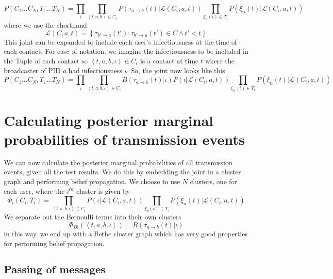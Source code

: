\documentclass{article}
\begin{document}
\begin{equation}
P(C_1...C_N, T_1...T_N) =
\prod_{i} \prod_{\left< t,a,b \right> \in C_i}
P\left(\tau_{a\rightarrow b}(t)|\mathcal{L}(C_i,a,t) \right)
\prod_{\xi_{n}(t) \in T_i}
P(\xi_{n}(t)|\mathcal{L}(C_i,a,t))
\label{joint}
\end{equation}
where we use the shorthand
\[
\mathcal{L}(C,a,t) =   \left\{ \tau_{b'\rightarrow a}(t'):\tau_{b' \rightarrow a}(t') \in C \wedge t' < t \right\}
\]
This joint can be expanded to include each user's infectiousness at the time of each contact. For ease of notation, we imagine the infectiousness to be included in the Tuple of each contact so $\left<t,a,b,\iota\right> \in C_i$ is a contact at time $t$ where the broadcaster of PID $a$ had infectiousness $\iota$. So, the joint now looks like this
\begin{equation}
P(C_1...C_N, T_1...T_N) =
\prod_{i} \prod_{\left< t,a,b, \iota \right> \in C_i}
B(\tau_{a\rightarrow b}(t)|\iota)
P\left(\iota|\mathcal{L}(C_i,a,t) \right)
\prod_{\xi_{n}(t) \in T_i}
P(\xi_{n}(t)|\mathcal{L}(C_i,a,t))
\label{ijoint}
\end{equation}


\section{Calculating posterior marginal probabilities of transmission events}

We can now calculate the posterior marginal probabilities of all transmission events, given all the test results. We do this by embedding the joint in a cluster graph and performing belief propagation. We choose to use $N$ clusters, one for each user, where the $i^{th}$ cluster is given by
\begin{equation}
\Phi_i(C_i, T_i) =
\prod_{\left< t,a,b, \iota \right> \in C_i}
P\left(\iota|\mathcal{L}(C_i,a,t) \right)
\prod_{\xi_{n}(t) \in T_i}
P(\xi_{n}(t)|\mathcal{L}(C_i,a,t))
\label{ijoint}
\end{equation}
We separate out the Bernoulli terms into their own clusters
\begin{equation}
\Phi_{Bi}(\left<t,a,b,\iota\right>) = B(\tau_{a\rightarrow b}(t)|\iota)
\end{equation}
in this way, we end up with a Bethe cluster graph which has very good properties for performing belief propagation.

\subsection{Passing of messages}
\end{document}

